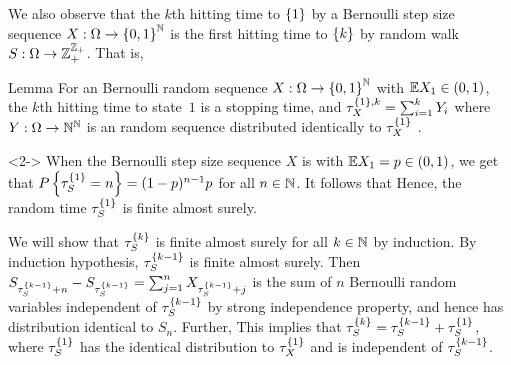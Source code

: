 \documentclass[12pt,aspectratio=169]{beamer}
\begin{document}
\begin {frame}
\begin{Example}
We also observe that the $k$th hitting time to $\left\{1\right\}$ by a Bernoulli step size sequence $X:\Omega\to\left\{0,1\right\}^{\mathbb{N}}$ is the first hitting time to $\left\{k\right\}$ by random walk $S:\Omega\to\mathbb{Z}_+^{\mathbb{Z}_+}$. 
That is,  
\end{Example}
\end{frame}


\begin{frame}
\begin{block}{Lemma} 
For an \iid Bernoulli random sequence $X:\Omega\to\left\{0,1\right\}^{\mathbb{N}}$ with $\mathbb{E} X_1 \in (0,1)$, 
the $k$th hitting time to state~$1$ is a stopping time, and $\tau_X^{\left\{1\right\}, k} = \sum_{i=1}^kY_i$ where $Y:\Omega\to\mathbb{N}^{\mathbb{N}}$ is an \iid random sequence distributed identically to $\tau_X^{\left\{1\right\}}$ . 
\end{block}

\begin{Proof}<2->
When the Bernoulli step size sequence $X$ is \iid with $\mathbb{E} X_1 = p \in (0,1)$, 
we get that $P\left\{\tau_S^{\left\{1\right\}}= n\right\} = (1-p)^{n-1}p$ for all $n \in \mathbb{N}$. 
It follows that 
Hence, the random time $\tau_S^{\left\{1\right\}}$ is finite almost surely. 
\end{Proof}
\end{frame}


\begin{frame}
\begin{Proof}
We will show that $\tau_S^{\left\{k\right\}}$ is finite almost surely for all $k \in \mathbb{N}$ by induction. 
By induction hypothesis, $\tau_S^{\left\{k-1\right\}}$ is finite almost surely. 
Then $S_{\tau_S^{\left\{k-1\right\}}+n}-S_{\tau_S^{\left\{k-1\right\}}} = \sum_{j=1}^nX_{\tau_S^{\left\{k-1\right\}}+j}$ is the sum of $n$ \iid Bernoulli random variables independent of $\tau_S^{\left\{k-1\right\}}$ by strong independence property,  
and hence has distribution identical to $S_n$. 
Further,  
This implies that $\tau_S^{\left\{k\right\}} = \tau_S^{\left\{k-1\right\}} + \tau_S^{\left\{1\right\}}$, 
where $\tau_S^{\left\{1\right\}}$ has the identical distribution to $\tau_X^{\left\{1\right\}}$ and is independent of $\tau_S^{\left\{k-1\right\}}$. 
\end{Proof}   
\end{frame}
\end{document}

